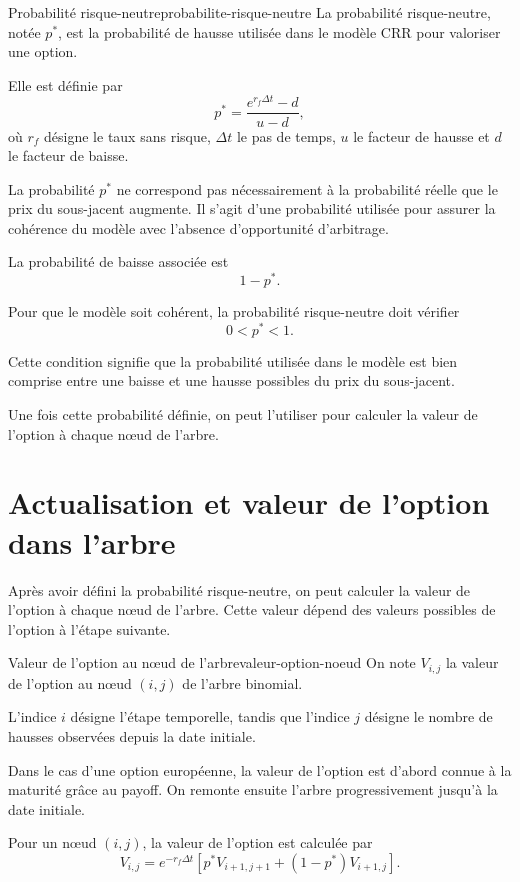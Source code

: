 \documentclass[11pt]{report}
\begin{document}
\begin{definition}{Probabilité risque-neutre}{probabilite-risque-neutre}
La probabilité risque-neutre, notée $p^*$, est la probabilité de hausse utilisée dans le modèle CRR pour valoriser une option.

Elle est définie par
\[
p^* = \frac{e^{r_f\Delta t} - d}{u-d},
\]
où $r_f$ désigne le taux sans risque, $\Delta t$ le pas de temps, $u$ le facteur de hausse et $d$ le facteur de baisse.
\end{definition}

La probabilité $p^*$ ne correspond pas nécessairement à la probabilité réelle que le prix du sous-jacent augmente. Il s'agit d'une probabilité utilisée pour assurer la cohérence du modèle avec l'absence d'opportunité d'arbitrage.

La probabilité de baisse associée est
\[
1-p^*.
\]

Pour que le modèle soit cohérent, la probabilité risque-neutre doit vérifier
\[
0 < p^* < 1.
\]

Cette condition signifie que la probabilité utilisée dans le modèle est bien comprise entre une baisse et une hausse possibles du prix du sous-jacent.

Une fois cette probabilité définie, on peut l'utiliser pour calculer la valeur de l'option à chaque nœud de l'arbre.

\section{Actualisation et valeur de l'option dans l'arbre}

Après avoir défini la probabilité risque-neutre, on peut calculer la valeur de l'option à chaque nœud de l'arbre. Cette valeur dépend des valeurs possibles de l'option à l'étape suivante.

\begin{definition}{Valeur de l'option au nœud de l'arbre}{valeur-option-noeud}
On note $V_{i,j}$ la valeur de l'option au nœud $(i,j)$ de l'arbre binomial.

L'indice $i$ désigne l'étape temporelle, tandis que l'indice $j$ désigne le nombre de hausses observées depuis la date initiale.
\end{definition}

Dans le cas d'une option européenne, la valeur de l'option est d'abord connue à la maturité grâce au payoff. On remonte ensuite l'arbre progressivement jusqu'à la date initiale.

Pour un nœud $(i,j)$, la valeur de l'option est calculée par
\[
V_{i,j}
=
e^{-r_f\Delta t}
\left[
p^* V_{i+1,j+1}
+
(1-p^*)V_{i+1,j}
\right].
\]
\end{document}
